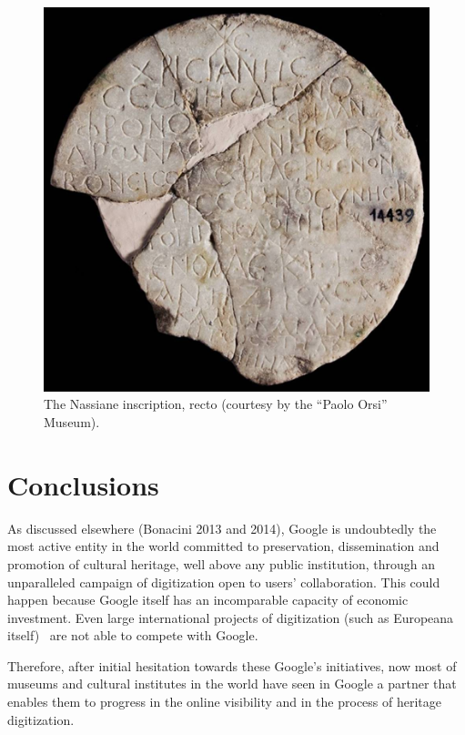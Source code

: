 \documentclass[amsthm,ebook]{saparticle}
\begin{document}
\begin{figure}[!bp]
\centering
 \includegraphics[width=\columnwidth]{EAGLE2016BONACINIPilotprojectatPaoloOrsiMuseum-img006.jpg}
\caption{ The Nassiane inscription, recto (courtesy by the ``Paolo Orsi'' Museum). }
\label{fig:6}
\end{figure}

\section{Conclusions}


As discussed elsewhere (Bonacini 2013 and 2014), Google is undoubtedly the most active entity in the world committed to
preservation, dissemination and promotion of cultural heritage, well above any public institution, through an
unparalleled campaign of digitization open to users’ collaboration. This could happen because Google itself has an
incomparable capacity of economic investment. Even large international projects of digitization (such as Europeana
itself) \ are not able to compete with Google.

Therefore, after initial hesitation towards these Google’s initiatives, now most of museums and cultural institutes in
the world have seen in Google a partner that enables them to progress in the online visibility and in the process of
heritage digitization.
\end{document}
